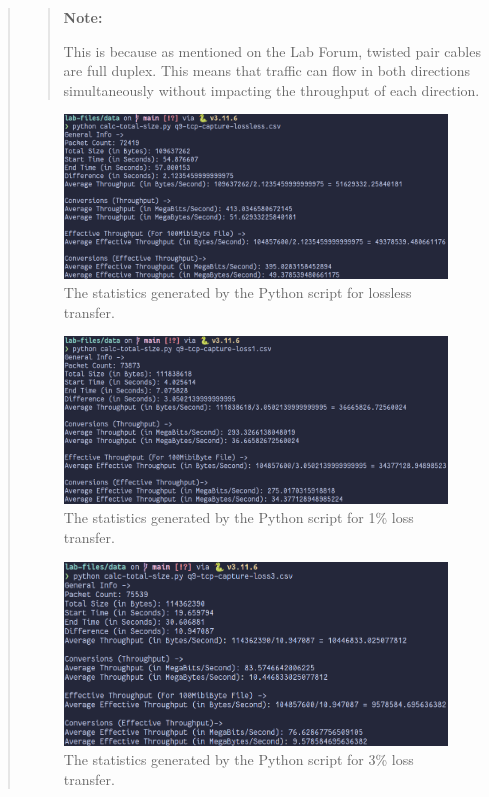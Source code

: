 \documentclass{article}
\newenvironment{ans}
{\fbox{Answer}\begin{quote}\nopagebreak}
{\end{quote}}
\newenvironment{note}{%
\begin{quote}
\begin{tcolorbox}[colback=gray!10,arc=0mm,boxrule=0pt]
\raggedright
\textbf{Note:}%
}{%
\end{tcolorbox}
\end{quote}%
}
\begin{document}
\begin{ans}
\begin{note}
This is because as mentioned on the Lab Forum, twisted pair
cables are full duplex. This means that traffic can flow in both
directions simultaneously without impacting the throughput of
each direction.
\end{note}

\begin{figure}[H]
\centering
\includegraphics[width=16cm]{data/q9-stats-tcp-lossless.png}
\caption{The statistics generated by the Python script for lossless transfer.}
\end{figure}

\begin{figure}[H]
\centering
\includegraphics[width=16cm]{data/q9-stats-tcp-loss1.png}
\caption{The statistics generated by the Python script for 1\% loss transfer.}
\end{figure}

\begin{figure}[H]
\centering
\includegraphics[width=16cm]{data/q9-stats-tcp-loss3.png}
\caption{The statistics generated by the Python script for 3\% loss transfer.}
\end{figure}


\end{ans}
\end{document}
